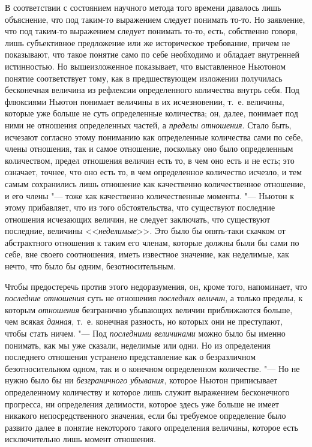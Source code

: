 В соответствии с состоянием научного метода того времени давалось лишь
объяснение, что под таким-то выражением следует понимать то-то. Но
заявление, что под таким-то выражением следует понимать то-то, есть,
собственно говоря, лишь субъективное предложение или же историческое
требование, причем не показывают, что такое понятие само по себе необходимо
и обладает внутренней истинностью. Но вышеизложенное показывает, что
выставленное Ньютоном понятие соответствует тому, как в предшествующем
изложении получилась бесконечная величина из рефлексии определенного
количества внутрь себя. Под флюксиями Ньютон понимает величины в их
исчезновении, т.~е. величины, которые уже больше не суть определенные
количества; он, далее, понимает под ними не отношения определенных частей,
а {\em пределы отношения}. Стало быть, исчезают
согласно этому пониманию как определенные количества сами по себе, члены
отношения, так и самое отношение, поскольку оно было определенным
количеством, предел отношения величин есть то, в чем оно есть и не есть;
это означает, точнее, что оно есть то, в чем определенное количество
исчезло, и тем самым сохранились лишь отношение как качественно
количественное отношение, и его члены "--- тоже как качественно количественные
моменты. "--- Ньютон к этому прибавляет, что из того обстоятельства, что
существуют последние отношения исчезающих величин, не следует заключать,
что существуют последние, величины <<{\em неделимые}>>.
Это было бы опять-таки скачком от абстрактного отношения к таким его
членам, которые должны были бы сами по себе, вне своего соотношения, иметь
известное значение, как неделимые, как нечто, что было бы одним,
безотносительным.

Чтобы предостеречь против этого недоразумения, он, кроме того, напоминает,
что {\em последние отношения} суть не отношения
{\em последних величин}, а только пределы, к которым
{\em отношения} безгранично убывающих величин
приближаются больше, чем всякая {\em данная}, т.~е.
конечная разность, но которых они не преступают, чтобы стать ничем. "--- Под
{\em последними величинами} можно было бы именно
понимать, как мы уже сказали, неделимые или одни. Но из определения
последнего отношения устранено представление как о безразличном
безотносительном одном, так и о конечном определенном количестве. "--- Но не
нужно было бы ни {\em безграничного убывания}, которое
Ньютон приписывает определенному количеству и которое лишь служит
выражением бесконечного прогресса, ни определения делимости, которое здесь
уже больше не имеет никакого непосредственного значения, если бы требуемое
определение было развито далее в понятие некоторого такого определения
величины, которое есть исключительно лишь момент отношения.


